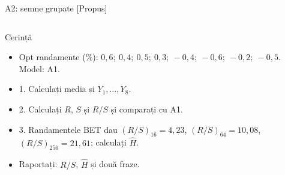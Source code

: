 \begin{frame}{A2: semne grupate [Propus]}
\propsub
\itemsize{\scriptsize}
\begin{columns}[T]
\begin{column}{\taskw}
\begin{block}{Cerință}
\begin{itemize}
    \item Opt randamente (\%): $0{,}6;\ 0{,}4;\ 0{,}5;\ 0{,}3;\ -0{,}4;\ -0{,}6;\ -0{,}2;\ -0{,}5$. Model: A1.
    \item 1. Calculați media și $Y_1, \dots, Y_8$.
    \item 2. Calculați $R$, $S$ și $R/S$ și comparați cu A1.
    \item 3. Randamentele BET dau $(R/S)_{16} = 4{,}23$, $(R/S)_{64} = 10{,}08$, $(R/S)_{256} = 21{,}61$; calculați $\hat H$.
    \item Raportați: $R/S$, $\hat H$ și două fraze.
\end{itemize}
\end{block}
\end{column}
\begin{column}{\solw}
\end{column}
\end{columns}
\end{frame}

